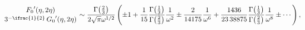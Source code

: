 \[{\mathop{F_{0}\/}\nolimits'\!\left(\eta,2\eta\right)\atop{3^{-\ifrac{1}{2}}%
\mathop{G_{0}\/}\nolimits'\!\left(\eta,2\eta\right)}}\sim\frac{\mathop{\Gamma%
\/}\nolimits\!\left(\frac{2}{3}\right)}{2\sqrt{\pi}\omega^{1/2}}\left(\pm 1+%
\frac{1}{15}\frac{\mathop{\Gamma\/}\nolimits\!\left(\frac{1}{3}\right)}{%
\mathop{\Gamma\/}\nolimits\!\left(\frac{2}{3}\right)}\frac{1}{\omega^{2}}\pm%
\frac{2}{14175}\frac{1}{\omega^{6}}+\frac{1436}{23\,38875}\frac{\mathop{\Gamma%
\/}\nolimits\!\left(\frac{1}{3}\right)}{\mathop{\Gamma\/}\nolimits\!\left(%
\frac{2}{3}\right)}\frac{1}{\omega^{8}}\pm\cdots\right),\]
